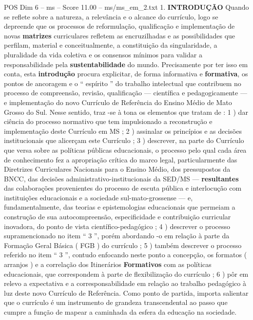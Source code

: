 \begin{textsample}{POS Dim 6 – ms – Score 11.00 – ms/ms\_em\_2.txt}  \label{ex:f6_pos_052}
1. \textbf{INTRODUÇÃO} Quando se reflete sobre a natureza, a relevância e o alcance do currículo, logo se depreende que os processos de reformulação, qualificação e implementação de novas \textbf{matrizes} curriculares refletem as encruzilhadas e as possibilidades que perfilam, material e conceitualmente, a constituição da singularidade, a pluralidade da vida coletiva e os consensos mínimos para validar a responsabilidade pela \textbf{sustentabilidade} do mundo.
Precisamente por ter isso em conta, esta \textbf{introdução} procura explicitar, de forma informativa e \textbf{formativa}, os pontos de ancoragem e o “ espírito ” do trabalho intelectual que contribuem no processo de compreensão, revisão, qualificação — científica e pedagogicamente — e implementação do novo Currículo de Referência do Ensino Médio de Mato Grosso do Sul.
Nesse sentido, traz -se à tona os elementos que tratam de : 1 ) dar ciência do processo normativo que tem impulsionado a reconstrução e implementação deste Currículo em MS ; 2 ) assinalar os princípios e as decisões institucionais que alicerçam este Currículo ; 3 ) descrever, na parte do Currículo que versa sobre as políticas públicas educacionais, o processo pelo qual cada área de conhecimento fez a apropriação crítica do marco legal, particularmente das Diretrizes Curriculares Nacionais para o Ensino Médio, dos pressupostos da BNCC, das decisões administrativo-institucionais da SED/MS — \textbf{resultantes} das colaborações provenientes do processo de escuta pública e interlocução com instituições educacionais e a sociedade sul-mato-grossense — e, fundamentalmente, das teorias e epistemologias educacionais que permeiam a construção de sua autocompreensão, especificidade e contribuição curricular inovadora, do ponto de vista científico-pedagógico ; 4 ) descrever o processo supramencionado no item “ 3 ”, porém abordando -o em relação à parte da Formação Geral Básica ( FGB ) do currículo ; 5 ) também descrever o processo referido no item “ 3 ”, contudo enfocando neste ponto a concepção, os formatos ( arranjos ) e a correlação dos Itinerários \textbf{Formativos} com as políticas educacionais, que correspondem à parte de flexibilização do currículo ; 6 ) pôr em relevo a expectativa e a corresponsabilidade em relação ao trabalho pedagógico à luz deste novo Currículo de Referência.
Como ponto de partida, importa salientar que o currículo é um instrumento de grandeza transcendental ao passo que cumpre a função de mapear a caminhada da esfera da educação na sociedade.

\end{textsample}
